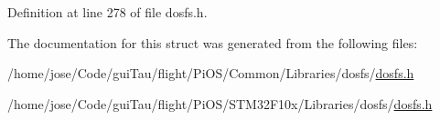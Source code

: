 Definition at line 278 of file dosfs.\-h.



The documentation for this struct was generated from the following files\-:\begin{DoxyCompactItemize}
\item 
/home/jose/\-Code/gui\-Tau/flight/\-Pi\-O\-S/\-Common/\-Libraries/dosfs/\hyperlink{_common_2_libraries_2dosfs_2dosfs_8h}{dosfs.\-h}\item 
/home/jose/\-Code/gui\-Tau/flight/\-Pi\-O\-S/\-S\-T\-M32\-F10x/\-Libraries/dosfs/\hyperlink{_s_t_m32_f10x_2_libraries_2dosfs_2dosfs_8h}{dosfs.\-h}\end{DoxyCompactItemize}
